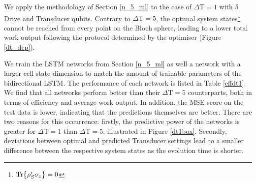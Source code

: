 We apply the methodology of Section \ref{n_5_ml} to the case of $\Delta \mathrm{T} = 1$ with 5 Drive and Transducer qubits.
Contrary to $\Delta \mathrm{T} = 5$, the optimal system states\footnote{$\Tr{\rho_S^i \sigma_z} = 0$} cannot be reached from every point on the Bloch sphere, leading to a lower total work output following the protocol determined by the optimiser (Figure \ref{dt_dep}).

We train the LSTM networks from Section \ref{n_5_ml} as well a network with a larger cell state dimension to match the amount of trainable parameters of the bidirectional LSTM.
The performance of each network is listed in Table \ref{effdt1}.
We find that all networks perform better than their $\Delta \mathrm{T} = 5$ counterparts, both in terms of efficiency and average work output.
In addition, the MSE score on the test data is lower, indicating that the predictions themselves are better.
There are two reasons for this occurrence: firstly, the predictive power of the networks is greater for $\Delta \mathrm{T} = 1$ than $\Delta \mathrm{T} = 5$, illustrated in Figure \ref{dt1box}.
Secondly, deviations between optimal and predicted Transducer settings lead to a smaller difference between the respective system states as the evolution time is shorter.

